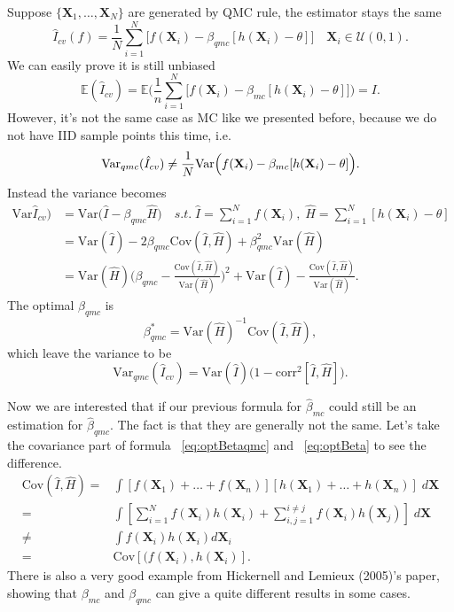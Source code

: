 Suppose $\{\mathbf{X}_1, \dots, \mathbf{X}_N\}$ are generated by QMC rule, the estimator stays the same
\[
    \hat{I}_{cv}(f)=\frac{1}{N}\sum_{i=1}^{N}\Big[ f(\mathbf{\mathbf{X}}_i)-\beta_{qmc}[h(\mathbf{X}_i)-\theta] \Big] \quad \mathbf{X}_i\in \mathcal{U}(0,1).
\]
We can easily prove it is still unbiased
\[
\mathbb{E}(\hat{I}_{cv})=\mathbb{E}\Big(\frac{1}{n}\sum_{i=1}^{N}\Big[f(\mathbf{X}_i)-\beta_{mc}[h(\mathbf{X}_i)-\theta] \Big] \Big)=I.
\]
However, it's not the same case as MC like we presented before, because we do not have IID sample points this time, i.e.
\[
\mathrm{Var}_{qmc}(\hat{I}_{cv}) \not=\frac{1}{N}\mathrm{Var}\Big(f(\mathbf{X}_i)-\beta_{mc}[h(\mathbf{X}_i)-\theta]\Big).\\
\]
Instead the variance becomes
\begin{align*}
    \mathrm{Var}\hat{I}_{cv})  
    &=\mathrm{Var}\Big( \hat{I}- \beta_{qmc}\hat{H}\Big)
    \quad s.t.\; \hat{I}=\sum_{i=1}^{N}f(\mathbf{X}_i),\; \hat{H}=\sum_{i=1}^{N}[h(\mathbf{X}_i)-\theta]\\
    &=\mathrm{Var}(\hat{I})-2\beta_{qmc}\mathrm{Cov}(\hat{I},\hat{H})+\beta_{qmc}^2\mathrm{Var}(\hat{H})\\
    &=\mathrm{Var}(\hat{H})\Big(\beta_{qmc}-\frac{\mathrm{Cov}(\hat{I},\hat{H})}{\mathrm{Var}(\hat{H})}\Big)^2+\mathrm{Var}(\hat{I})-\frac{\mathrm{Cov}(\hat{I},\hat{H})}{\mathrm{Var}(\hat{H})}.
\end{align*}
The optimal $\beta_{qmc}$ is
\begin{equation}
    \beta_{qmc}^*= \mathrm{Var} (\hat{H})^{-1}\mathrm{Cov} (\hat{I}, \hat{H}),
    \label{eq:optBetaqmc}
\end{equation}
which leave the variance to be
\[
    \mathrm{Var}_{qmc}(\hat{I}_{cv})=\mathrm{Var}(\hat{I})\big(1-\mathrm{corr}^2[\hat{I}, \hat{H}]\big).
\]

Now we are interested that if our previous formula for $\hat{\beta}_{mc}$ could still be an estimation for $\hat{\beta}_{qmc}$. The fact is that they are generally not the same. Let's take the covariance part of formula ~\eqref{eq:optBetaqmc} and ~\eqref{eq:optBeta} to see the difference. 
\begin{align*}
    \mathrm{Cov}(\hat{I}, \hat{H})=&\int [f(\mathbf{X}_1)+\dots+f(\mathbf{X}_n)][h(\mathbf{X}_1)+\dots+h(\mathbf{X}_n)]\; d\mathbf{\mathbf{X}}\\
    =&\int [\sum_{i=1}^{N}f(\mathbf{X}_i)h(\mathbf{X}_i) + \sum_{i,j=1}^{i\neq j}f(\mathbf{X}_i)h(\mathbf{X}_j)]\; d\mathbf{\mathbf{X}}\\
    \neq&\int f(\mathbf{X}_i)h(\mathbf{X}_i)d\mathbf{X}_i\\
    =&\mathrm{Cov}[(f(\mathbf{X}_i),h(\mathbf{X}_i)].
\end{align*}
There is also a very good example from Hickernell and Lemieux (2005)\cite{hickernell2005control}'s paper, showing that $\beta_{mc}$ and $\beta_{qmc}$ can give a quite different results in some cases. 



